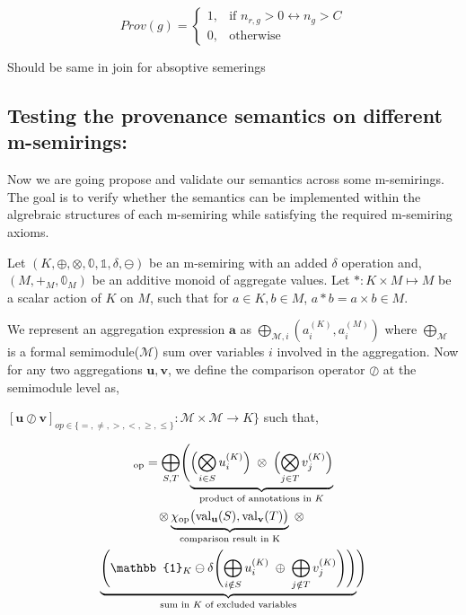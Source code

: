 \documentclass[twocolumn]{article}
\begin{document}
$$Prov(g) = \begin{cases}
   1, & \text{if } n_{r, g} > 0 \leftrightarrow n_g > C \\
   0, & \text{otherwise}
   \end{cases}$$

Should be same in join for absoptive semerings

\subsection{Testing the provenance semantics on different m-semirings:}
Now we are going propose and validate our semantics across some m-semirings. The goal is to 
verify whether the semantics can be implemented within the algrebraic structures of each m-semiring 
while satisfying the required m-semiring axioms.

Let $(K,\oplus,\otimes,\mathbb{0},\mathbb{1},\delta,\ominus)$ be an m-semiring with an 
added $\delta$ operation and, $(M,+_M,\mathbb{0}_M)$ be an 
additive monoid of aggregate values. Let $*:K\times M \mapsto M$ be a scalar action of $K$ on $M$, such that for $a \in K, b \in M$, 
$a * b = a \times b \in M$.

We represent an aggregation expression $\mathbf{a}$ as  $\bigoplus_{\mathcal{M},i}(a_i^{(K)},a_i^{(M)})$ where $\bigoplus_{\mathcal{M}}$ is a formal semimodule($\mathcal{M}$) sum over 
variables $i$ involved in the aggregation.
Now for any two aggregations $\mathbf{u},\mathbf{v}$, we define the comparison operator $\oslash$ at the semimodule level as, 

$[\mathbf{u} \oslash \mathbf{v}]_{\mathit{op}\in\{ =, \neq , >, <, \geq, \leq\}}:\mathcal{M} \times \mathcal{M} \rightarrow K\}$ such that, 

\begin{multline}
[\mathbf{u} \oslash \mathbf{v}]_{\mathrm{op}}=
\bigoplus_{S,T} 
\Biggl(
\underbrace{
\Bigl( \bigotimes_{i \in S} u_i^{(K)} \Bigr) \;\otimes\; \Bigl( \bigotimes_{j \in T} v_j^{(K)} \Bigr)
}_{\text{product of annotations in } K} \\
\otimes
\underbrace{
\chi_{\mathrm{op}}\bigl(\mathrm{val}_\mathbf{u}(S), \mathrm{val}_\mathbf{v}(T)\bigr)
}_{\text{comparison result in K}} 
\;\otimes\;\\
\underbrace{
\Biggl(\mathbb{1}_K \ominus \delta\Biggl( \bigoplus_{i \notin S} u_i^{(K)} \;\oplus\; \bigoplus_{j \notin T} v_j^{(K)} \Biggr)\Biggr)
}_{\text{sum in $K$ of excluded variables}}
\Biggr)
\end{multline}
\end{document}
